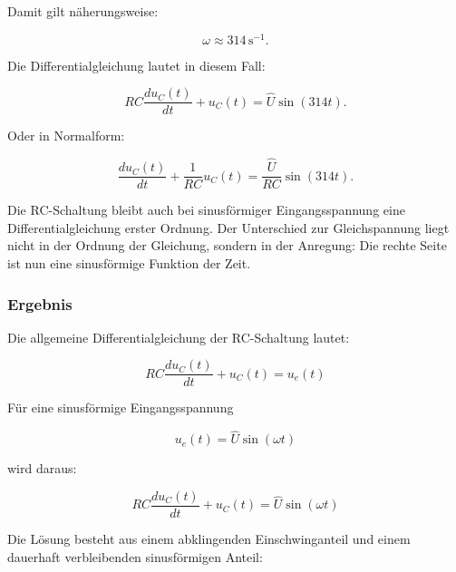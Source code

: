 Damit gilt näherungsweise:

\begin{equation}
	\omega \approx 314\,\mathrm{s}^{-1}.
	\label{eq:rc-kreisfrequenz-50hz-naeherung}
\end{equation}

Die Differentialgleichung lautet in diesem Fall:

\begin{equation}
	RC \frac{du_C(t)}{dt}
	+
	u_C(t)
	=
	\hat{U}\sin(314t).
	\label{eq:rc-dgl-50hz}
\end{equation}

Oder in Normalform:

\begin{equation}
	\frac{du_C(t)}{dt}
	+
	\frac{1}{RC}u_C(t)
	=
	\frac{\hat{U}}{RC}\sin(314t).
	\label{eq:rc-dgl-50hz-normalform}
\end{equation}

\begin{DidacticBox}[Einordnung]
	\label{box:rc-sinus-einordnung}
	Die RC-Schaltung bleibt auch bei sinusförmiger Eingangsspannung eine
	Differentialgleichung erster Ordnung. Der Unterschied zur Gleichspannung liegt
	nicht in der Ordnung der Gleichung, sondern in der Anregung: Die rechte Seite
	ist nun eine sinusförmige Funktion der Zeit.
\end{DidacticBox}

\subsubsection{Ergebnis}
\label{subsubsec:rc-sinus-ergebnis}

Die allgemeine Differentialgleichung der RC-Schaltung lautet:

\begin{equation}
	\boxed{
		RC \frac{du_C(t)}{dt}
		+
		u_C(t)
		=
		u_e(t)
	}
	\label{eq:rc-dgl-allgemein-ergebnis}
\end{equation}

Für eine sinusförmige Eingangsspannung

\[
u_e(t)=\hat{U}\sin(\omega t)
\]

wird daraus:

\begin{equation}
	\boxed{
		RC \frac{du_C(t)}{dt}
		+
		u_C(t)
		=
		\hat{U}\sin(\omega t)
	}
	\label{eq:rc-dgl-sinus-ergebnis}
\end{equation}

Die Lösung besteht aus einem abklingenden Einschwinganteil und einem dauerhaft
verbleibenden sinusförmigen Anteil:

